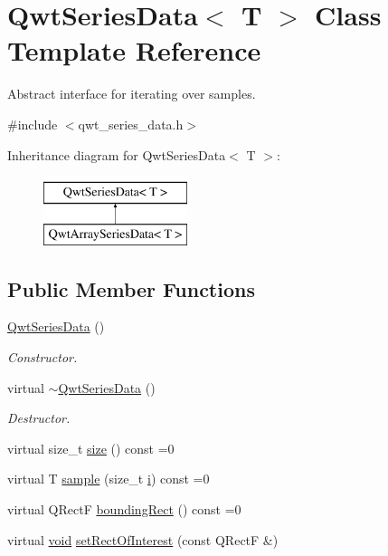 \hypertarget{class_qwt_series_data}{\section{Qwt\-Series\-Data$<$ T $>$ Class Template Reference}
\label{class_qwt_series_data}
}


Abstract interface for iterating over samples.  




{\ttfamily \#include $<$qwt\-\_\-series\-\_\-data.\-h$>$}

Inheritance diagram for Qwt\-Series\-Data$<$ T $>$\-:\begin{figure}[H]
\begin{center}
\leavevmode
\includegraphics[height=2.000000cm]{class_qwt_series_data}
\end{center}
\end{figure}
\subsection*{Public Member Functions}
\begin{DoxyCompactItemize}
\item 
\hyperlink{class_qwt_series_data_a3f075340d18fb112a342d74716eb8d9c}{Qwt\-Series\-Data} ()
\begin{DoxyCompactList}\small\item\em Constructor. \end{DoxyCompactList}\item 
virtual \hyperlink{class_qwt_series_data_a841a56f909879d599a385b9c3d046745}{$\sim$\-Qwt\-Series\-Data} ()
\begin{DoxyCompactList}\small\item\em Destructor. \end{DoxyCompactList}\item 
virtual size\-\_\-t \hyperlink{class_qwt_series_data_a3cfe5b26fc55a887ac85b0103ae80a3e}{size} () const =0
\item 
virtual T \hyperlink{class_qwt_series_data_ae8650d16c07c58f01897ab48658a3266}{sample} (size\-\_\-t \hyperlink{uavobjecttemplate_8m_a6f6ccfcf58b31cb6412107d9d5281426}{i}) const =0
\item 
virtual Q\-Rect\-F \hyperlink{class_qwt_series_data_aedb969ba51a27d88d26ad7f7cb1c2c7f}{bounding\-Rect} () const =0
\item 
virtual \hyperlink{group___u_a_v_objects_plugin_ga444cf2ff3f0ecbe028adce838d373f5c}{void} \hyperlink{class_qwt_series_data_a81466c72589c03310543d17e1f1d0ab7}{set\-Rect\-Of\-Interest} (const Q\-Rect\-F \&)
\end{DoxyCompactItemize}
